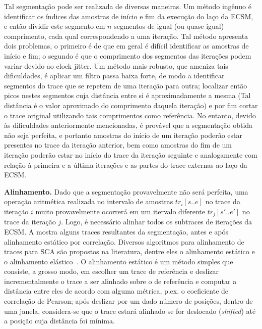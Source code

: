 \noindent Tal segmentação pode ser realizada de diversas maneiras. Um método ingênuo é identificar os índices das amostras de início e fim da execução do laço da ECSM, e então dividir este segmento em $n$ segmentos de igual (ou quase igual) comprimento, cada qual correspondendo a uma iteração. Tal método apresenta dois problemas, o primeiro é de que em geral é difícil identificar as amostras de início e fim; o segundo é que o comprimento dos segmentos das iterações podem variar devido ao clock jitter. Um método mais robusto, que ameniza tais dificuldades, é aplicar um filtro passa baixa forte, de modo a identificar segmentos do trace que se repetem de uma iteração para outra; localizar então picos nestes segmentos cuja distância entre si é aproximadamente a mesma (Tal distância é o valor aproximado do comprimento daquela iteração) e por fim cortar o trace original utilizando tais comprimentos como referência. No entanto, devido às dificuldades anteriormente mencionadas, é provável que a segmentação obtida não seja perfeita, e portanto amostras do início de um iteração poderão estar presentes no trace da iteração anterior, bem como amostras do fim de um iteração poderão estar no início do trace da iteração seguinte e analogamente com relação à primeira e a última iterações e as partes do trace externas ao laço da ECSM.

\noindent \textbf{Alinhamento.} Dado que a segmentação provavelmente não será perfeita, uma operação aritmética realizada no intervalo de amostras $tr_i[s..e]$ no trace da iteração $i$ muito provavelmente ocorrerá em um itervalo diferente $tr_j[s'..e']$ no trace da iteração $j$. Logo, é necessário alinhar todos os subtraces de iterações da ECSM. A  mostra alguns traces resultantes da segmentação, antes e após alinhamento estático por correlação. Diversos algoritmos para alinhamento de traces para SCA são propostos na literatura, dentre eles o alinhamento estático e o alinhamento elástico~\cite{WoudenbergWittemanBakker2011}. O alinhamento estático é um método simples que consiste, a grosso modo, em escolher um trace de referência e deslizar incrementalmente o trace a ser alinhado sobre o de referência e computar a distância entre eles de acordo com alguma métrica, p.ex. o coeficiente de correlação de Pearson; após deslizar por um dado número de posições, dentro de uma janela, considera-se que o trace estará alinhado se for deslocado (\textit{shifted}) até a posição cuja distância foi mínima.

